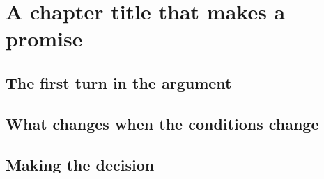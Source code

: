 \chapter{A chapter title that makes a promise}
\label{ch:replace-with-existing-source-label}



\section{The first turn in the argument}
\label{sec:replace-with-existing-section-label}


\section{What changes when the conditions change}


\section{Making the decision}



